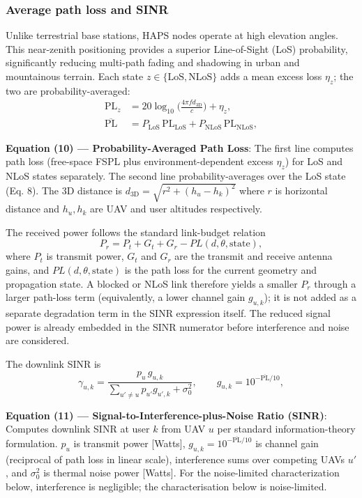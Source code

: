 \documentclass[conference]{IEEEtran}
\begin{document}
\subsubsection{Average path loss and SINR}
Unlike terrestrial base stations, HAPS nodes operate at high elevation angles. This near-zenith positioning provides a superior Line-of-Sight (LoS) probability, significantly reducing multi-path fading and shadowing in urban and mountainous terrain.
Each state $z\in\{\mathrm{LoS},\mathrm{NLoS}\}$ adds a mean excess loss $\eta_z$;
the two are probability-averaged:
\begin{align}
\mathrm{PL}_z &= 20\log_{10}\!\Big(\tfrac{4\pi f d_\mathrm{3D}}{c}\Big) + \eta_z,\\
\overline{\mathrm{PL}} &= P_\mathrm{LoS}\,\mathrm{PL}_\mathrm{LoS}
                        + P_\mathrm{NLoS}\,\mathrm{PL}_\mathrm{NLoS},
\label{eq:pl}
\end{align}

\noindent\textbf{Equation (10) --- Probability-Averaged Path Loss}: The first line computes path loss (free-space FSPL plus environment-dependent excess $\eta_z$) for LoS and NLoS states separately. The second line probability-averages over the LoS state (Eq. 8). The 3D distance is $d_\mathrm{3D}=\sqrt{r^2+(h_u-h_k)^2}$ where $r$ is horizontal distance and $h_u, h_k$ are UAV and user altitudes respectively.

The received power follows the standard link-budget relation
\begin{equation}
P_r = P_t + G_t + G_r - PL(d,\theta,\mathrm{state}),
\label{eq:rx-power}
\end{equation}
where $P_t$ is transmit power, $G_t$ and $G_r$ are the transmit and receive antenna gains, and $PL(d,\theta,\mathrm{state})$ is the path loss for the current geometry and propagation state. A blocked or NLoS link therefore yields a smaller $P_r$ through a larger path-loss term (equivalently, a lower channel gain $g_{u,k}$); it is not added as a separate degradation term in the SINR expression itself. The reduced signal power is already embedded in the SINR numerator before interference and noise are considered.

The downlink SINR is
\begin{equation}
\gamma_{u,k} = \frac{p_u\,g_{u,k}}{\sum_{u'\neq u} p_{u'} g_{u',k} + \sigma_0^2},
\qquad g_{u,k}=10^{-\overline{\mathrm{PL}}/10},
\label{eq:sinr}
\end{equation}

\noindent\textbf{Equation (11) --- Signal-to-Interference-plus-Noise Ratio (SINR)}: Computes downlink SINR at user $k$ from UAV $u$ per standard information-theory formulation. $p_u$ is transmit power [Watts], $g_{u,k}=10^{-\overline{\mathrm{PL}}/10}$ is channel gain (reciprocal of path loss in linear scale), interference sums over competing UAVs $u'$, and $\sigma_0^2$ is thermal noise power [Watts]. For the noise-limited characterization below, interference is negligible; the characterisation below is
noise-limited.
\end{document}

